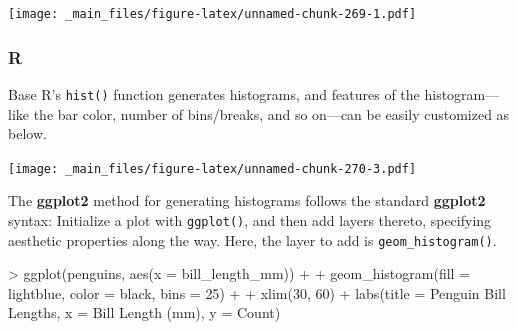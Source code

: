 \documentclass[
]{book}
\newenvironment{Shaded}{\begin{snugshade}}{\end{snugshade}}
\newcommand{\AttributeTok}[1]{\textcolor[rgb]{0.77,0.63,0.00}{#1}}
\newcommand{\DecValTok}[1]{\textcolor[rgb]{0.00,0.00,0.81}{#1}}
\newcommand{\FunctionTok}[1]{\textcolor[rgb]{0.00,0.00,0.00}{#1}}
\newcommand{\NormalTok}[1]{#1}
\newcommand{\SpecialCharTok}[1]{\textcolor[rgb]{0.00,0.00,0.00}{#1}}
\newcommand{\StringTok}[1]{\textcolor[rgb]{0.31,0.60,0.02}{#1}}
\begin{document}
\texttt{[image: \_main\_files/figure-latex/unnamed-chunk-269-1.pdf]}

\hypertarget{r-41}{%
\subsubsection*{R}\label{r-41}}

Base R's \texttt{hist()} function generates histograms, and features of the histogram---like the bar color, number of bins/breaks, and so on---can be easily customized as below.

\begin{Shaded}
\end{Shaded}

\texttt{[image: \_main\_files/figure-latex/unnamed-chunk-270-3.pdf]}

The \textbf{ggplot2} method for generating histograms follows the standard \textbf{ggplot2} syntax: Initialize a plot with \texttt{ggplot()}, and then add layers thereto, specifying aesthetic properties along the way. Here, the layer to add is \texttt{geom\_histogram()}.

\begin{Shaded}
\begin{Highlighting}[]
\SpecialCharTok{\textgreater{}} \FunctionTok{ggplot}\NormalTok{(penguins, }\FunctionTok{aes}\NormalTok{(}\AttributeTok{x =}\NormalTok{ bill\_length\_mm)) }\SpecialCharTok{+}
\SpecialCharTok{+}   \FunctionTok{geom\_histogram}\NormalTok{(}\AttributeTok{fill =} \StringTok{\textquotesingle{}lightblue\textquotesingle{}}\NormalTok{, }\AttributeTok{color =} \StringTok{\textquotesingle{}black\textquotesingle{}}\NormalTok{, }\AttributeTok{bins =} \DecValTok{25}\NormalTok{) }\SpecialCharTok{+}
\SpecialCharTok{+}   \FunctionTok{xlim}\NormalTok{(}\DecValTok{30}\NormalTok{, }\DecValTok{60}\NormalTok{) }\SpecialCharTok{+} \FunctionTok{labs}\NormalTok{(}\AttributeTok{title =} \StringTok{\textquotesingle{}Penguin Bill Lengths\textquotesingle{}}\NormalTok{, }\AttributeTok{x =} \StringTok{\textquotesingle{}Bill Length (mm)\textquotesingle{}}\NormalTok{, }\AttributeTok{y =} \StringTok{\textquotesingle{}Count\textquotesingle{}}\NormalTok{)}
\end{Highlighting}
\end{Shaded}
\end{document}

